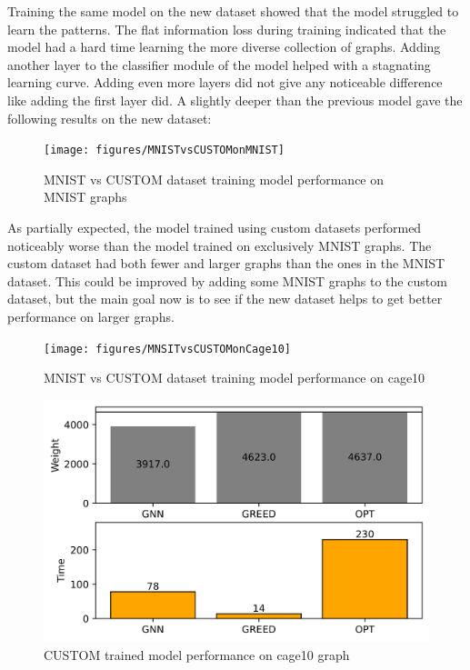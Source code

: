 Training the same model on the new dataset showed that the model struggled to learn the patterns. The flat information loss during training indicated that the model had a hard time learning the more diverse collection of graphs. Adding another layer to the classifier module of the model helped with a stagnating learning curve. Adding even more layers did not give any noticeable difference like adding the first layer did. A slightly deeper than the previous model gave the following results on the new dataset:

\begin{figure}[H]
    \centering
    \hspace*{-2cm}
    \texttt{[image: figures/MNISTvsCUSTOMonMNIST]}
    \caption{MNIST vs CUSTOM dataset training model performance on MNIST graphs}
    \label{models performance comparison}
\end{figure}

As partially expected, the model trained using custom datasets performed noticeably worse than the model trained on exclusively MNIST graphs. The custom dataset had both fewer and larger graphs than the ones in the MNIST dataset. This could be improved by adding some MNIST graphs to the custom dataset, but the main goal now is to see if the new dataset helps to get better performance on larger graphs. 

\begin{figure}[H]
    \centering
    \hspace*{-2cm}
    \texttt{[image: figures/MNSITvsCUSTOMonCage10]}
    \caption{MNIST vs CUSTOM dataset training model performance on cage10}
    \label{models performance comparison}
\end{figure}

\begin{figure}[H]
    \centering
    \includegraphics[scale=1.0]{figures/CUSTOMtrainCAGE10}
    \caption{CUSTOM trained model performance on cage10 graph}
    \label{model performance}
\end{figure}

